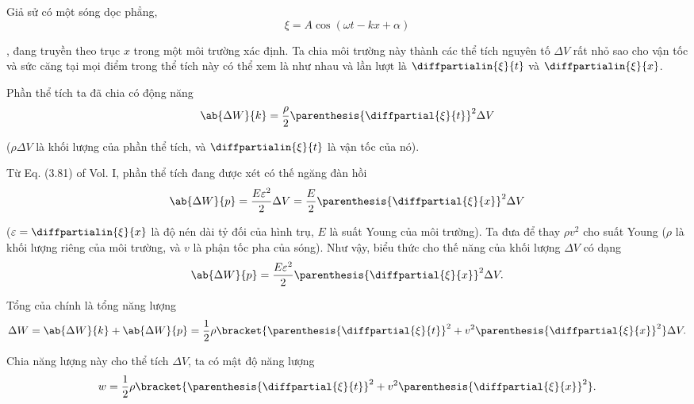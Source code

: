 Giả sử có một sóng dọc phẳng,
\begin{equation*}
	\xi = A \cos(\omega t - kx + \alpha)
\end{equation*}

, đang truyền theo trục $x$ trong một môi trường xác định. Ta chia môi trường này thành các thể tích nguyên tố $\Delta{V}$ rất nhỏ sao cho vận tốc và sức căng tại mọi điểm trong thể tích này có thể xem là như nhau và lần lượt là $\diffpartialin{\xi}{t}$ và $\diffpartialin{\xi}{x}$.

Phần thể tích ta đã chia có động năng
\begin{equation}\label{eq:14_38}
	\ab{\Delta{W}}{k} = \frac{\rho}{2} \parenthesis{\diffpartial{\xi}{t}}^2 \Delta{V}
\end{equation}

\noindent
($\rho\Delta{V}$ là khối lượng của phần thể tích, và $\diffpartialin{\xi}{t}$ là vận tốc của nó).

Từ Eq. (3.81) of Vol. I, phần thể tích đang được xét có thế ngăng đàn hồi
\begin{equation*}
	\ab{\Delta{W}}{p} = \frac{E\varepsilon^2}{2} \Delta{V}  = \frac{E}{2} \parenthesis{\diffpartial{\xi}{x}}^2 \Delta{V}
\end{equation*}

\noindent
($\varepsilon=\diffpartialin{\xi}{x}$ là độ nén dài tỷ đối của hình trụ, $E$ là suất Young của môi trường). Ta đưa  để thay $\rho v^2$ cho suất Young ($\rho$ là khối lượng riêng của môi trường, và $v$ là phận tốc pha của sóng). Như vậy, biểu thức cho thế năng của khối lượng $\Delta{V}$ có dạng
\begin{equation}\label{eq:14_39}
	\ab{\Delta{W}}{p} = \frac{E\varepsilon^2}{2} \parenthesis{\diffpartial{\xi}{x}}^2 \Delta{V}.
\end{equation}

Tổng của  chính là tổng năng lượng
\begin{equation}\label{eq:14_40}
	\Delta{W} = \ab{\Delta{W}}{k} + \ab{\Delta{W}}{p} = \frac{1}{2} \rho \bracket{ \parenthesis{\diffpartial{\xi}{t}}^2 + v^2 \parenthesis{\diffpartial{\xi}{x}}^2 } \Delta{V}.
\end{equation}

\noindent
Chia năng lượng này cho thể tích $\Delta{V}$, ta có mật độ năng lượng
\begin{equation}\label{eq:14_41}
	w = \frac{1}{2} \rho \bracket{ \parenthesis{\diffpartial{\xi}{t}}^2 + v^2 \parenthesis{\diffpartial{\xi}{x}}^2 }.
\end{equation}

